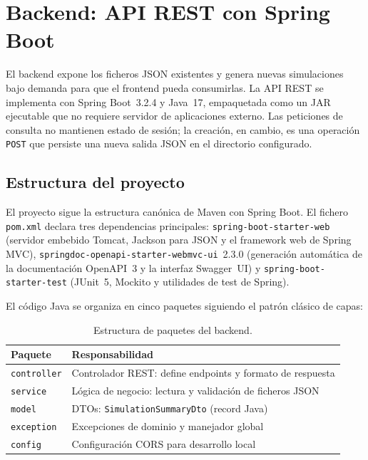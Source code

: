 \section{Backend: API REST con Spring Boot}
\label{sec:impl_backend}

El backend expone los ficheros JSON existentes y genera nuevas simulaciones bajo demanda
para que el frontend pueda consumirlas. La API REST se implementa con Spring Boot~3.2.4 y
Java~17, empaquetada como un JAR ejecutable que no requiere servidor de aplicaciones
externo. Las peticiones de consulta no mantienen estado de sesión; la creación, en cambio,
es una operación \texttt{POST} que persiste una nueva salida JSON en el directorio
configurado.

\subsection{Estructura del proyecto}
\label{sec:backend_estructura}

El proyecto sigue la estructura canónica de Maven con Spring Boot. El fichero
\texttt{pom.xml} declara tres dependencias principales: \texttt{spring-boot-starter-web}
(servidor embebido Tomcat, Jackson para JSON y el framework web de Spring MVC),
\texttt{springdoc-openapi-starter-webmvc-ui}~2.3.0 (generación automática de la
documentación OpenAPI~3 y la interfaz Swagger~UI) y \texttt{spring-boot-starter-test}
(JUnit~5, Mockito y utilidades de test de Spring).

El código Java se organiza en cinco paquetes siguiendo el patrón clásico de capas:

\begin{table}[H]
\centering
\caption{Estructura de paquetes del backend.}
\label{tab:backend_paquetes}
\begin{tabularx}{\textwidth}{|l|X|}
\hline
\textbf{Paquete} & \textbf{Responsabilidad} \\
\hline
\texttt{controller} & Controlador REST: define endpoints y formato de respuesta \\
\texttt{service}    & Lógica de negocio: lectura y validación de ficheros JSON \\
\texttt{model}      & DTOs: \texttt{SimulationSummaryDto} (record Java) \\
\texttt{exception}  & Excepciones de dominio y manejador global \\
\texttt{config}     & Configuración CORS para desarrollo local \\
\hline
\end{tabularx}
\end{table}

